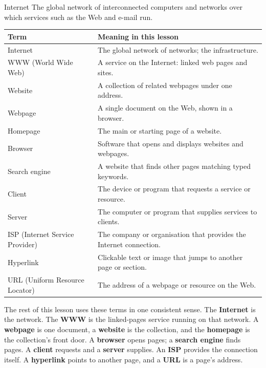 \begin{definitionbox}{Internet}
The global network of interconnected computers and networks over which
services such as the Web and e-mail run.
\end{definitionbox}

\begin{center}
\begin{tabular}{p{}p{}}
\toprule
\textbf{Term} & \textbf{Meaning in this lesson} \\
\midrule
Internet & The global network of networks; the infrastructure. \\
WWW (World Wide Web) & A service on the Internet: linked web pages and sites. \\
Website & A collection of related webpages under one address. \\
Webpage & A single document on the Web, shown in a browser. \\
Homepage & The main or starting page of a website. \\
Browser & Software that opens and displays websites and webpages. \\
Search engine & A website that finds other pages matching typed keywords. \\
Client & The device or program that requests a service or resource. \\
Server & The computer or program that supplies services to clients. \\
ISP (Internet Service Provider) & The company or organisation that provides the Internet connection. \\
Hyperlink & Clickable text or image that jumps to another page or section. \\
URL (Uniform Resource Locator) & The address of a webpage or resource on the Web. \\
\bottomrule
\end{tabular}
\end{center}

The rest of this lesson uses these terms in one consistent sense. The
\textbf{Internet} is the network. The \textbf{WWW} is the linked-pages
service running on that network. A \textbf{webpage} is one document, a
\textbf{website} is the collection, and the \textbf{homepage} is the
collection's front door. A \textbf{browser} opens pages; a \textbf{search
engine} finds pages. A \textbf{client} requests and a \textbf{server}
supplies. An \textbf{ISP} provides the connection itself. A
\textbf{hyperlink} points to another page, and a \textbf{URL} is a page's
address.

